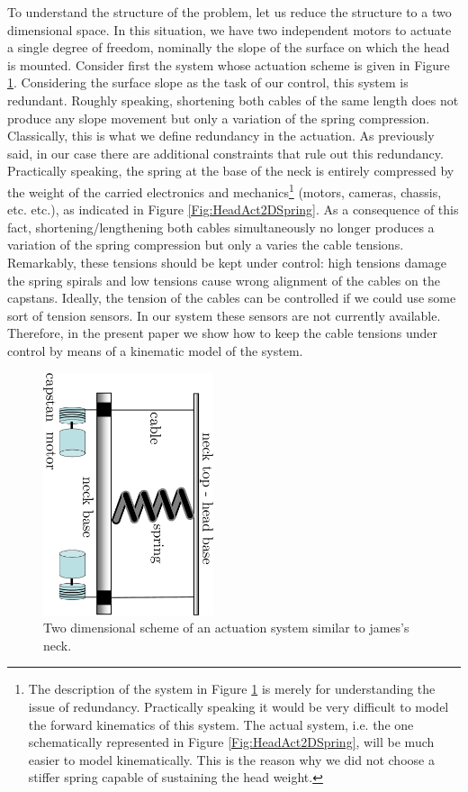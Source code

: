 \documentclass[conference]{IEEEtran}
\numberwithin{equation}{section}
\begin{document}
To understand the structure of the problem, let us reduce the structure to a two dimensional space. In this situation, we have two independent motors to actuate a single degree of freedom, nominally the slope of the surface on which the head is mounted.
Consider first the system whose actuation scheme is given in Figure \ref{Fig:HeadAct2D}. Considering the surface slope as the task of our control, this system is redundant. Roughly speaking, shortening both cables of the same length does not produce any slope movement but only a variation of the spring compression. Classically, this is what we define redundancy in the actuation.
As previously said, in our case there are additional constraints that rule out this redundancy. Practically speaking, the spring at the base of the neck is entirely compressed by the weight of the carried electronics and mechanics\footnote{The description of the system in Figure \ref{Fig:HeadAct2D} is merely for understanding the issue of redundancy. Practically speaking it would be very difficult to model the forward kinematics of this system. The actual system, i.e. the one schematically represented in Figure \ref{Fig:HeadAct2DSpring}, will be much easier to model kinematically. This is the reason why we did not choose a stiffer spring capable of sustaining the head weight.} (motors, cameras, chassis, etc. etc.), as indicated in Figure \ref{Fig:HeadAct2DSpring}. As a consequence of this fact, shortening/lengthening both cables simultaneously no longer produces a variation of the spring compression but only a varies the cable tensions. Remarkably, these tensions should be kept under control: high tensions damage the spring spirals and low tensions cause wrong alignment of the cables on the capstans. Ideally, the tension of the cables can be controlled if we could use some sort of tension sensors. In our system these sensors are not currently available. Therefore, in the present paper we show how to keep the cable tensions under control by means of a kinematic model of the system.

\begin{figure}[tbp]
\centering
\includegraphics[width=50mm, angle=90]{image/Neck2DSpring.pdf} 
\caption{Two dimensional scheme of an actuation system similar to james's neck.}
\label{Fig:HeadAct2D}
\end{figure}
\end{document}
